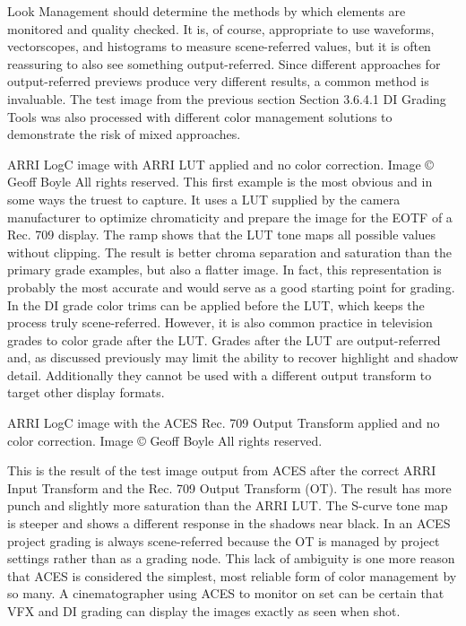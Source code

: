 Look Management should determine the methods by which elements are monitored and quality checked. It is, of course, appropriate to use waveforms, vectorscopes, and histograms to measure scene-referred values, but it is often reassuring to also see something output-referred. Since different approaches for output-referred previews produce very different results, a common method is invaluable. The test image from the previous section Section 3.6.4.1 DI Grading Tools was also processed with different color management solutions to demonstrate the risk of mixed approaches.


ARRI LogC image with ARRI LUT applied and no color correction.  Image © Geoff Boyle All rights reserved.
This first example is the most obvious and in some ways the truest to capture. It uses a LUT supplied by the camera manufacturer to optimize chromaticity and prepare the image for the EOTF of a Rec. 709 display. The ramp shows that the LUT tone maps all possible values without clipping. The result is better chroma separation and saturation than the primary grade examples, but also a flatter image. In fact, this representation is probably the most accurate and would serve as a good starting point for grading. In the DI grade color trims can be applied before the LUT, which keeps the process truly scene-referred. However, it is also common practice in television grades to color grade after the LUT. Grades after the LUT are output-referred and, as discussed previously may limit the ability to recover highlight and shadow detail. Additionally they cannot be used with a different output transform to target other display formats.


ARRI LogC image with the ACES Rec. 709 Output Transform applied and no color correction.  Image © Geoff Boyle All rights reserved.


This is the result of the test image output from ACES after the correct ARRI Input Transform and the Rec. 709 Output Transform (OT). The result has more punch and slightly more saturation than the ARRI LUT. The S-curve tone map is steeper and shows a different response in the shadows near black. In an ACES project grading is always scene-referred because the OT is managed by project settings rather than as a grading node. This lack of ambiguity is one more reason that ACES is considered the simplest, most reliable form of color management by so many. A cinematographer using ACES to monitor on set can be certain that VFX and DI grading can display the images exactly as seen when shot.


